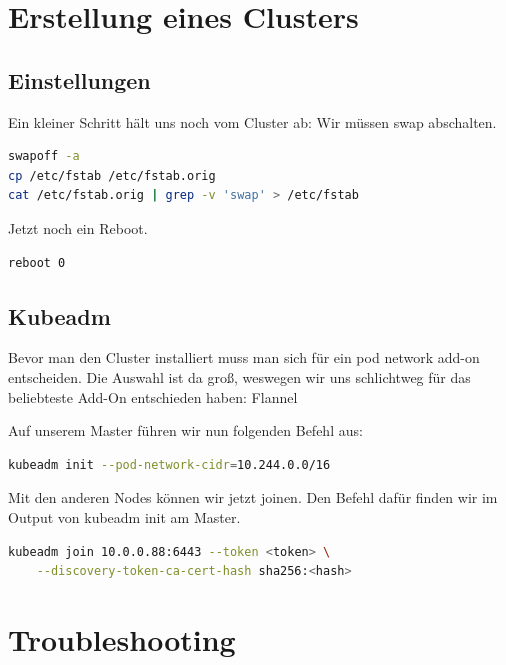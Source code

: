 \hypertarget{erstellung-eines-clusters}{%
\newpage
\section{Erstellung eines Clusters}\label{erstellung-eines-clusters}}

\hypertarget{einstellungen}{%
\subsection{Einstellungen}\label{einstellungen}}

Ein kleiner Schritt hält uns noch vom Cluster ab: Wir müssen swap
abschalten.

\begin{lstlisting}[language=Bash]
swapoff -a
cp /etc/fstab /etc/fstab.orig
cat /etc/fstab.orig | grep -v 'swap' > /etc/fstab
\end{lstlisting}

Jetzt noch ein Reboot.

\begin{lstlisting}[language=Bash]
reboot 0
\end{lstlisting}

\hypertarget{kubeadm}{%
\subsection{Kubeadm}\label{kubeadm}}

Bevor man den Cluster installiert muss man sich für ein pod network
add-on entscheiden. Die Auswahl ist da groß, weswegen wir uns
schlichtweg für das beliebteste Add-On entschieden haben: Flannel

Auf unserem Master führen wir nun folgenden Befehl aus:

\begin{lstlisting}[language=Bash]
kubeadm init --pod-network-cidr=10.244.0.0/16
\end{lstlisting}

Mit den anderen Nodes können wir jetzt joinen. Den Befehl dafür finden
wir im Output von kubeadm init am Master.

\begin{lstlisting}[language=Bash]
kubeadm join 10.0.0.88:6443 --token <token> \
    --discovery-token-ca-cert-hash sha256:<hash>
\end{lstlisting}

\hypertarget{troubleshooting}{%
\newpage
\section{Troubleshooting}\label{troubleshooting}}

